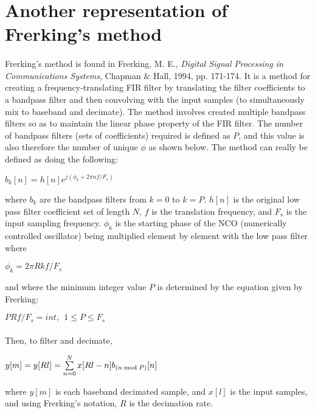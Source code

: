 \documentclass{article}
\begin{document}
    \section{Another representation of Frerking's method}
        \paragraph{} 
        Frerking's method is found in Frerking, M. E., \textit{Digital Signal Processing in Communications Systems}, Chapman \& Hall, 1994, pp. 171-174. It is a method for creating a frequency-translating FIR filter by translating the filter coefficients to a bandpass filter and then convolving with the input samples (to simultaneously mix to baseband and decimate). The method involves created multiple bandpass filters so as to maintain the linear phase property of the FIR filter. The number of bandpass filters (sets of coefficients) required is defined as $P$, and this value is also therefore the number of unique ${\phi}$ as shown below. The method can really be defined as doing the following:
        
        \begin{center}
            ${{b}_k[n]} = h[n]e^{j({\phi}_k + 2{\pi}nf/{F}_s)} $
        \end{center}
        where ${b}_k$ are the bandpass filters from $k=0$ to $k=P$. ${h[n]}$ is the original low pass filter coefficient set of length $N$, $f$ is the translation frequency, and ${F}_s$ is the input sampling frequency. ${{\phi}_k}$ is the starting phase of the NCO (numerically controlled oscillator) being multiplied element by element with the low pass filter where 
        \begin{center}
            ${\phi}_k = 2{\pi}Rkf/{F}_s$
        \end{center}
        and where the minimum integer value $P$ is determined by the equation given by Frerking:
        \begin{center}
            $PRf/{F}_s = int,\ \ 1 \leq P \leq {F}_s $
        \end{center}
        
        \paragraph{}
        Then, to filter and decimate,
        \begin{center}
            ${y[m]} = {y[Rl]} = \sum\limits_{n=0}^N x[Rl-n]{b}_{(n{\bmod}P)}[n] $
        \end{center}
        where ${y[m]}$ is each baseband decimated sample,  and ${x[l]}$ is the input samples, and using Frerking's notation, $R$ is the decimation rate.
        
\end{document}
